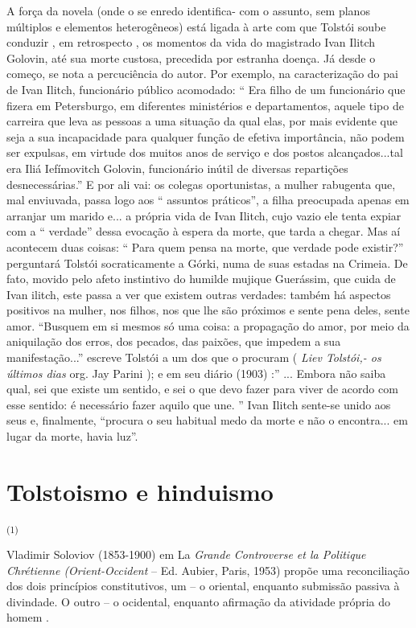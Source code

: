 A força da novela (onde o se enredo identifica- com o assunto, sem
planos múltiplos e elementos heterogêneos) está ligada à arte com que
Tolstói soube conduzir , em retrospecto , os momentos da vida do
magistrado Ivan Ilitch Golovin, até sua morte custosa, precedida por
estranha doença. Já desde o começo, se nota a percuciência do autor. Por
exemplo, na caracterização do pai de Ivan Ilitch, funcionário público
acomodado: `` Era filho de um funcionário que fizera em Petersburgo, em
diferentes ministérios e departamentos, aquele tipo de carreira que leva
as pessoas a uma situação da qual elas, por mais evidente que seja a sua
incapacidade para qualquer função de efetiva importância, não podem ser
expulsas, em virtude dos muitos anos de serviço e dos postos
alcançados...tal era Iliá Iefímovitch Golovin, funcionário inútil de
diversas repartições desnecessárias.'' E por ali vai: os colegas
oportunistas, a mulher rabugenta que, mal enviuvada, passa logo aos ``
assuntos práticos'', a filha preocupada apenas em arranjar um marido
e... a própria vida de Ivan Ilitch, cujo vazio ele tenta expiar com a ``
verdade'' dessa evocação à espera da morte, que tarda a chegar. Mas aí
acontecem duas coisas: `` Para quem pensa na morte, que verdade pode
existir?'' perguntará Tolstói socraticamente a Górki, numa de suas
estadas na Crimeia. De fato, movido pelo afeto instintivo do humilde
mujique Guerássim, que cuida de Ivan ilitch, este passa a ver que
existem outras verdades: também há aspectos positivos na mulher, nos
filhos, nos que lhe são próximos e sente pena deles, sente amor.
``Busquem em si mesmos só uma coisa: a propagação do amor, por meio da
aniquilação dos erros, dos pecados, das paixões, que impedem a sua
manifestação...'' escreve Tolstói a um dos que o procuram ( \emph{Liev
Tolstói,- os últimos dias} org. Jay Parini ); e em seu diário (1903) :''
... Embora não saiba qual, sei que existe um sentido, e sei o que devo
fazer para viver de acordo com esse sentido: é necessário fazer aquilo
que une. '' Ivan Ilitch sente-se unido aos seus e, finalmente, ``procura
o seu habitual medo da morte e não o encontra... em lugar da morte,
havia luz''.

\chapter{Tolstoismo e hinduismo}

\textsuperscript{(1)}

Vladimir Soloviov (1853-1900) em La \emph{Grande Controverse et la
Politique Chrétienne (Orient-Occident} -- Ed. Aubier, Paris, 1953)
propõe uma reconciliação dos dois princípios constitutivos, um -- o
oriental, enquanto submissão passiva à divindade. O outro -- o
ocidental, enquanto afirmação da atividade própria do homem .


